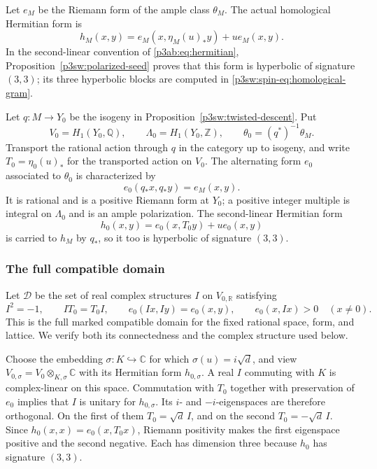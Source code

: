 \documentclass[11pt]{article}
\newcommand{\Q}{\mathbb Q}
\newcommand{\C}{\mathbb C}
\newcommand{\Z}{\mathbb Z}
\newcommand{\R}{\mathbb R}
\numberwithin{equation}{section}
\begin{document}
Let \(e_M\) be the Riemann form of the ample class \(\theta_M\).
The actual homological Hermitian form is
\[
 h_M(x,y)=e_M(x,\eta_M(u)_*y)+u e_M(x,y).
\]
In the second-linear convention of \eqref{p3ab:eq:hermitian},
Proposition~\ref{p3sw:polarized-seed} proves that this form is
hyperbolic of signature \((3,3)\); its three hyperbolic blocks are
computed in \eqref{p3sw:spin-eq:homological-gram}.

Let \(q:M\longrightarrow Y_0\) be the isogeny in
Proposition~\ref{p3sw:twisted-descent}.  Put
\[
 V_0=H_1(Y_0,\Q),\qquad \Lambda_0=H_1(Y_0,\Z),\qquad
 \theta_0=(q^*)^{-1}\theta_M.
\]
Transport the rational action through \(q\) in the category up to
isogeny, and write \(T_0=\eta_0(u)_*\) for the transported action
on \(V_0\).  The alternating form \(e_0\) associated to \(\theta_0\)
is characterized by
\[
 e_0(q_*x,q_*y)=e_M(x,y).
\]
It is rational and is a positive Riemann form at \(Y_0\); a positive
integer multiple is integral on \(\Lambda_0\) and is an ample
polarization.  The second-linear Hermitian form
\begin{equation}
\label{p3sw:endpoint-reference-hermitian}
 h_0(x,y)=e_0(x,T_0y)+u e_0(x,y)
\end{equation}
is carried to \(h_M\) by \(q_*\), so it too is hyperbolic of
signature \((3,3)\).

\subsubsection{The full compatible domain}

Let \(\mathscr D\) be the set of real complex structures \(I\) on
\(V_{0,\R}\) satisfying
\begin{equation}
\label{p3sw:endpoint-compatible-structures}
 I^2=-1,\qquad IT_0=T_0I,\qquad
 e_0(Ix,Iy)=e_0(x,y),\qquad e_0(x,Ix)>0\quad(x\ne0).
\end{equation}
This is the full marked compatible domain for the fixed rational
space, form, and lattice.  We verify both its connectedness and the
complex structure used below.

Choose the embedding \(\sigma:K\hookrightarrow\C\) for which
\(\sigma(u)=i\sqrt d\), and view \(V_{0,\sigma}=V_0\otimes_{K,\sigma}\C\)
with its Hermitian form \(h_{0,\sigma}\).  A real \(I\) commuting with
\(K\) is complex-linear on this space.  Commutation with \(T_0\)
together with preservation of \(e_0\) implies that \(I\) is
unitary for \(h_{0,\sigma}\).  Its \(i\)- and \(-i\)-eigenspaces are
therefore orthogonal.  On the first of them \(T_0=\sqrt d\,I\), and
on the second \(T_0=-\sqrt d\,I\).  Since
\(h_0(x,x)=e_0(x,T_0x)\), Riemann positivity makes the first
eigenspace positive and the second negative.  Each has dimension
three because \(h_0\) has signature \((3,3)\).
\end{document}
